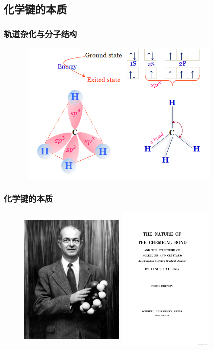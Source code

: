 \subsection{化学键的本质}
\frame
{
	\frametitle{轨道杂化与分子结构}
\begin{figure}[h!]
\centering
\vspace{-10.5pt}
\includegraphics[height=2.75in,width=4.00in,viewport=0 0 520 370,clip]{Figures/methane-gas.png}
\label{Bond_Hybrid}
\end{figure}
}

\frame
{
	\frametitle{化学键的本质}
\begin{figure}[h!]
\centering
\vspace{-10.5pt}
\includegraphics[height=2.80in,width=2.00in,viewport=0 0 1600 2050,clip]{Figures/Linus_Pauling.jpeg}
\includegraphics[height=2.80in,width=1.85in,viewport=0 0 420 650,clip]{Figures/The-Nature-of-the-Chemical-Bond_content.png}
\label{Pauling:Bond_Hybrid}
\end{figure}
}

